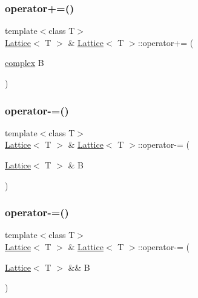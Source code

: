 \mbox{\label{class_lattice_ab94a46cade378e4daa689e2ddcf61ff3}} 
\subsubsection{\texorpdfstring{operator+=()}{operator+=()}\hspace{0.1cm}{\footnotesize\ttfamily [3/3]}}
{\footnotesize\ttfamily template$<$class T$>$ \\
\mbox{\hyperlink{class_lattice}{Lattice}}$<$ T $>$ \& \mbox{\hyperlink{class_lattice}{Lattice}}$<$ T $>$\+::operator+= (\begin{DoxyParamCaption}\item[{\mbox{\hyperlink{classcomplex}{complex}}}]{B }\end{DoxyParamCaption})\hspace{0.3cm}{\ttfamily [inline]}}

\mbox{\label{class_lattice_abc6ee1293f4490f34f96b85233b03ed1}} 
\subsubsection{\texorpdfstring{operator-\/=()}{operator-=()}\hspace{0.1cm}{\footnotesize\ttfamily [1/3]}}
{\footnotesize\ttfamily template$<$class T$>$ \\
\mbox{\hyperlink{class_lattice}{Lattice}}$<$ T $>$ \& \mbox{\hyperlink{class_lattice}{Lattice}}$<$ T $>$\+::operator-\/= (\begin{DoxyParamCaption}\item[{\mbox{\hyperlink{class_lattice}{Lattice}}$<$ T $>$ \&}]{B }\end{DoxyParamCaption})\hspace{0.3cm}{\ttfamily [inline]}}

\mbox{\label{class_lattice_a814b798e40210ac2aed7cbd876625c30}} 
\subsubsection{\texorpdfstring{operator-\/=()}{operator-=()}\hspace{0.1cm}{\footnotesize\ttfamily [2/3]}}
{\footnotesize\ttfamily template$<$class T$>$ \\
\mbox{\hyperlink{class_lattice}{Lattice}}$<$ T $>$ \& \mbox{\hyperlink{class_lattice}{Lattice}}$<$ T $>$\+::operator-\/= (\begin{DoxyParamCaption}\item[{\mbox{\hyperlink{class_lattice}{Lattice}}$<$ T $>$ \&\&}]{B }\end{DoxyParamCaption})\hspace{0.3cm}{\ttfamily [inline]}}

